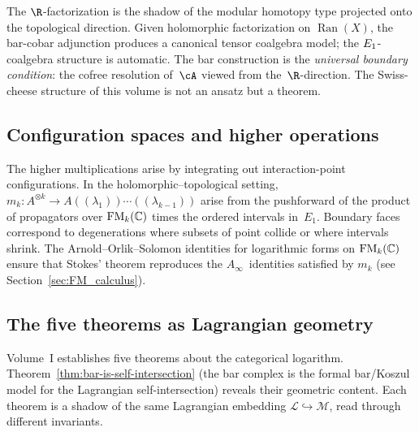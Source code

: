 \begin{remark}
\label{princ:R-shadow}
The $\R$-factorization is the shadow of the modular homotopy type
projected onto the topological direction. Given holomorphic
factorization on $\operatorname{Ran}(X)$, the bar-cobar
adjunction produces a canonical tensor coalgebra model; the
$E_1$-coalgebra structure is automatic. The bar construction
is the \emph{universal boundary condition}: the cofree resolution
of~$\cA$ viewed from the~$\R$-direction. The
Swiss-cheese structure of this volume is not an ansatz but a theorem.
\end{remark}

\subsection{Configuration spaces and higher operations}
\label{subsec:FM-higher-ops}
The higher multiplications arise by integrating out interaction-point
configurations. In the holomorphic--topological setting,
\(
m_k: A^{\otimes k}\to A((\lambda_1))\cdots((\lambda_{k-1}))
\)
arise from the pushforward of the product of propagators over $\mathrm{FM}_k(\mathbb C)$ times
the ordered intervals in~$E_1$.
Boundary faces correspond to degenerations where subsets of point collide or where intervals
shrink. The Arnold--Orlik--Solomon identities for logarithmic forms on $\mathrm{FM}_k(\mathbb C)$
ensure that Stokes' theorem reproduces the $A_\infty$~identities satisfied by $m_k$
(see Section~\ref{sec:FM_calculus}).

\subsection{The five theorems as Lagrangian geometry}
\label{subsec:five-theorems-lagrangian}

\providecommand{\cL}{\mathcal L}
\providecommand{\cM}{\mathcal M}
\providecommand{\HH}{\operatorname{HH}}
\providecommand{\Steinb}{\mathfrak{S}}

Volume~I establishes five theorems about the categorical logarithm.
Theorem~\ref{thm:bar-is-self-intersection} (the bar complex is the
formal bar/Koszul model for the Lagrangian self-intersection)
reveals their geometric content.
Each theorem is a shadow of the same Lagrangian embedding
$\cL \hookrightarrow \cM$, read through different invariants.

